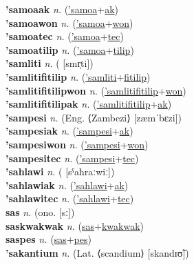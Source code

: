 \textbf{'samoaak} \textit{n.} (\hyperref['samoa]{'samoa}+\hyperref[ak]{ak})
 \label{'samoaak} \\
\textbf{'samoawon} \textit{n.} (\hyperref['samoa]{'samoa}+\hyperref[won]{won})
 \label{'samoawon} \\
\textbf{'samoatec} \textit{n.} (\hyperref['samoa]{'samoa}+\hyperref[tec]{tec})
 \label{'samoatec} \\
\textbf{'samoatilip} \textit{n.} (\hyperref['samoa]{'samoa}+\hyperref[tilip]{tilip})
 \label{'samoatilip} \\
\textbf{'samliti} \textit{n.} ( [smr̩ti])
 \label{'samliti} \\
\textbf{'samlitifitilip} \textit{n.} (\hyperref['samliti]{'samliti}+\hyperref[fitilip]{fitilip})
 \label{'samlitifitilip} \\
\textbf{'samlitifitilipwon} \textit{n.} (\hyperref['samlitifitilip]{'samlitifitilip}+\hyperref[won]{won})
 \label{'samlitifitilipwon} \\
\textbf{'samlitifitilipak} \textit{n.} (\hyperref['samlitifitilip]{'samlitifitilip}+\hyperref[ak]{ak})
 \label{'samlitifitilipak} \\
\textbf{'sampesi} \textit{n.} (Eng. ⟨Zambezi⟩ [zæmˈbɛzi])
 \label{'sampesi} \\
\textbf{'sampesiak} \textit{n.} (\hyperref['sampesi]{'sampesi}+\hyperref[ak]{ak})
 \label{'sampesiak} \\
\textbf{'sampesiwon} \textit{n.} (\hyperref['sampesi]{'sampesi}+\hyperref[won]{won})
 \label{'sampesiwon} \\
\textbf{'sampesitec} \textit{n.} (\hyperref['sampesi]{'sampesi}+\hyperref[tec]{tec})
 \label{'sampesitec} \\
\textbf{'sahlawi} \textit{n.} ( [sˤaħraːwiː])
 \label{'sahlawi} \\
\textbf{'sahlawiak} \textit{n.} (\hyperref['sahlawi]{'sahlawi}+\hyperref[ak]{ak})
 \label{'sahlawiak} \\
\textbf{'sahlawitec} \textit{n.} (\hyperref['sahlawi]{'sahlawi}+\hyperref[tec]{tec})
 \label{'sahlawitec} \\
\textbf{sas} \textit{n.} (ono. [sː])
 \label{sas} \\
\textbf{saskwakwak} \textit{n.} (\hyperref[sas]{sas}+\hyperref[kwakwak]{kwakwak})
 \label{saskwakwak} \\
\textbf{saspes} \textit{n.} (\hyperref[sas]{sas}+\hyperref[pes]{pes})
 \label{saspes} \\
\textbf{'sakantium} \textit{n.} (Lat. ⟨scandium⟩ [skandɪʊ̃])
